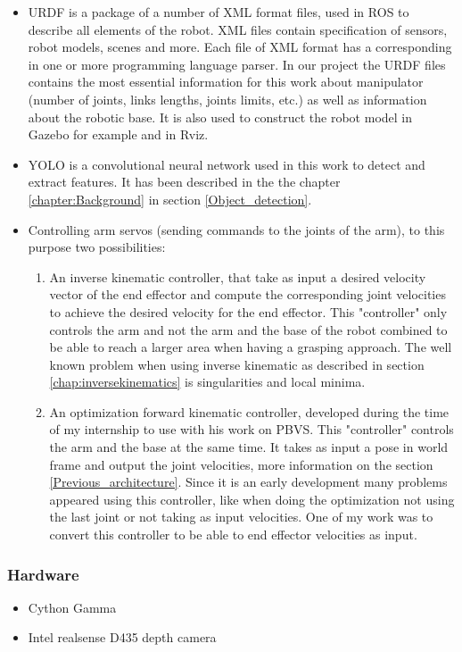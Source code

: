\begin{itemize}
    \item 
\gls{URDF} is a package of a number of XML format files, used in \gls{ROS} to describe all elements of the robot. XML files contain specification of sensors, robot models, scenes and more. Each file of XML format has a corresponding in one or more programming language parser. In our project the URDF files contains the most essential information for this work about manipulator (number of joints, links lengths, joints limits, etc.) as well as information about the robotic base. It is also used to construct the robot model in Gazebo for example and in Rviz.
    \item 
\gls{YOLO} is a convolutional neural network used in this work to detect and extract features. It has been described in the the chapter \ref{chapter:Background} in section \ref{Object_detection}.
    \item 
Controlling arm servos (sending commands to the joints of the arm), to this purpose two possibilities:
    \begin{enumerate}
        \item  An inverse kinematic controller, that take as input a desired velocity vector of the end effector and compute the corresponding joint velocities to achieve the desired velocity for the end effector. This "controller" only controls the arm and not the arm and the base of the robot combined to be able to reach a larger area when having a grasping approach. The well known problem when using inverse kinematic as described in section \ref{chap:inversekinematics} is singularities and local minima.
        \item An optimization forward kinematic controller, developed during the time of my internship to use with his work on \gls{PBVS}. This "controller" controls the arm and the base at the same time. It takes as input a pose in world frame and output the joint velocities, more information on the section \ref{Previous_architecture}. Since it is an early development many problems appeared using this controller, like when doing the optimization not using the last joint or not taking as input velocities. One of my work was to convert this controller to be able to end effector velocities as input.
    \end{enumerate}

\end{itemize}


\subsubsection{Hardware}
\begin{itemize}
    \item Cython Gamma 
    \item Intel realsense D435 depth camera
\end{itemize}

